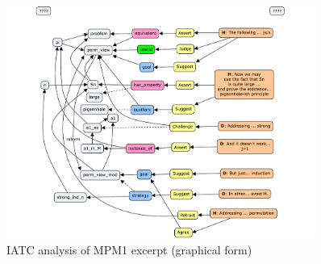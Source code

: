 \documentclass[smallextended,oneside]{svjour3}       %
\begin{document}
\begin{figure}[h]\label{IATCtagging}
\begin{center}
\includegraphics[trim=2mm 0 1mm 18mm,clip=true,width=0.9\textwidth]{IATCmainexample}
\end{center}
\caption{IATC analysis of MPM1 excerpt (graphical form)\label{fig:running-example-analysed-graphic}}
\end{figure}
\end{document}
